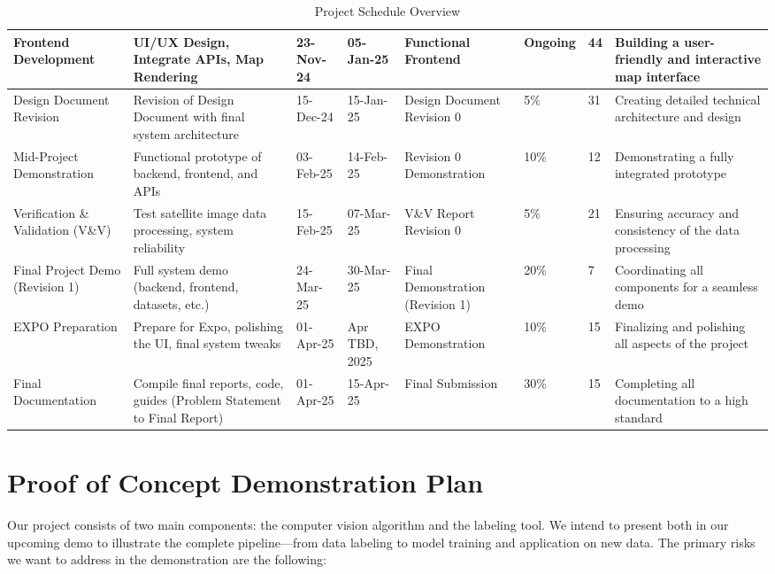 \documentclass{article}
\begin{document}
\begin{table}[h!]
\begin{adjustbox}{max width=\textwidth}
\begin{tabular}{|p{3cm}|p{5cm}|p{2.5cm}|p{2.5cm}|p{4cm}|p{2cm}|p{2.5cm}|p{4cm}|}
  Frontend Development & UI/UX Design, Integrate APIs, Map Rendering & 23-Nov-24 & 05-Jan-25 & Functional Frontend & Ongoing & 44 & Building a user-friendly and interactive map interface \\ \hline
  Design Document Revision & Revision of Design Document with final system architecture & 15-Dec-24 & 15-Jan-25 & Design Document Revision 0 & 5\% & 31 & Creating detailed technical architecture and design \\ \hline
  Mid-Project Demonstration & Functional prototype of backend, frontend, and APIs & 03-Feb-25 & 14-Feb-25 & Revision 0 Demonstration & 10\% & 12 & Demonstrating a fully integrated prototype \\ \hline
  Verification \& Validation (V\&V) & Test satellite image data processing, system reliability & 15-Feb-25 & 07-Mar-25 & V\&V Report Revision 0 & 5\% & 21 & Ensuring accuracy and consistency of the data processing \\ \hline
  Final Project Demo (Revision 1) & Full system demo (backend, frontend, datasets, etc.) & 24-Mar-25 & 30-Mar-25 & Final Demonstration (Revision 1) & 20\% & 7 & Coordinating all components for a seamless demo \\ \hline
  EXPO Preparation & Prepare for Expo, polishing the UI, final system tweaks & 01-Apr-25 & Apr TBD, 2025 & EXPO Demonstration & 10\% & 15 & Finalizing and polishing all aspects of the project \\ \hline
  Final Documentation & Compile final reports, code, guides (Problem Statement to Final Report) & 01-Apr-25 & 15-Apr-25 & Final Submission & 30\% & 15 & Completing all documentation to a high standard \\ \hline
  \end{tabular}
  \end{adjustbox}
  \caption{Project Schedule Overview}
  \end{table}


\section{Proof of Concept Demonstration Plan}

Our project consists of two main components: the computer vision algorithm and the labeling tool. We intend to present both in our upcoming demo to illustrate the complete pipeline—from data labeling to model training and application on new data. The primary risks we want to address in the demonstration are the following:
\end{document}
